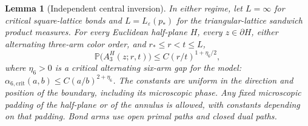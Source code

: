 \documentclass[11pt]{amsart}
\newtheorem{lemma}[theorem]{Lemma}
\theoremstyle{remark}
\newcommand{\Prob}{\mathbb P}
\begin{document}
\begin{lemma}[Independent central inversion]\label{lem:reflection}
In either regime, let $L=\infty$ for critical square-lattice bonds and
$L=L_\varepsilon(p_*)$ for the triangular-lattice sandwich product measures.
For every Euclidean half-plane $H$, every $z\in\partial H$, either alternating
three-arm color order, and $r_*\le r<t\le L$,
\begin{equation}\label{eq:reflection}
 \Prob\bigl(A_3^H(z;r,t)\bigr)
 \le C(r/t)^{1+\eta_6/2},
\end{equation}
where $\eta_6>0$ is a critical alternating six-arm gap for the model:
$\alpha_{6,\mathrm{crit}}(a,b)\le C(a/b)^{2+\eta_6}$.
The constants are uniform in the direction and position of the boundary,
including its microscopic phase.  Any fixed microscopic padding of the
half-plane or of the annulus is allowed, with constants depending on that
padding.  Bond arms use open primal paths and closed dual paths.
\end{lemma}
\end{document}
